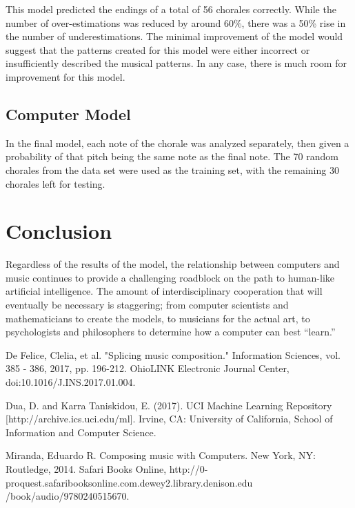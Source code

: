 \documentclass[12pt]{article}
\begin{document}
This model predicted the endings of a total of 56 chorales correctly. While the number of over-estimations was reduced by around 60\%, there was a 50\% rise in the number of underestimations. The minimal improvement of the model would suggest that the patterns created for this model were either incorrect or insufficiently described the musical patterns. In any case, there is much room for improvement for this model.

\subsection{Computer Model}
In the final model, each note of the chorale was analyzed separately, then given a probability of that pitch being the same note as the final note. The 70 random chorales from the data set were used as the training set, with the remaining 30 chorales left for testing.

\section{Conclusion}
Regardless of the results of the model, the relationship between computers and music continues to provide a challenging roadblock on the path to human-like artificial intelligence. The amount of interdisciplinary cooperation that will eventually be necessary is staggering; from computer scientists and mathematicians to create the models, to musicians for the actual art, to psychologists and philosophers to determine how a computer can best ``learn.'' 

\begin{thebibliography}{10}
  De Felice, Clelia, et al. "Splicing music composition." Information Sciences, vol. 385 - 386, 2017, pp. 196-212. OhioLINK Electronic Journal Center, doi:10.1016/J.INS.2017.01.004.

  Dua, D. and Karra Taniskidou, E. (2017). UCI Machine Learning Repository [http://archive.ics.uci.edu/ml]. Irvine, CA: University of California, School of Information and Computer Science.

  Miranda, Eduardo R. Composing music with Computers. New York, NY: Routledge, 2014. Safari Books Online, http://0-proquest.safaribooksonline.com.dewey2.library.denison.edu\\/book/audio/9780240515670.
\end{thebibliography}
\end{document}
